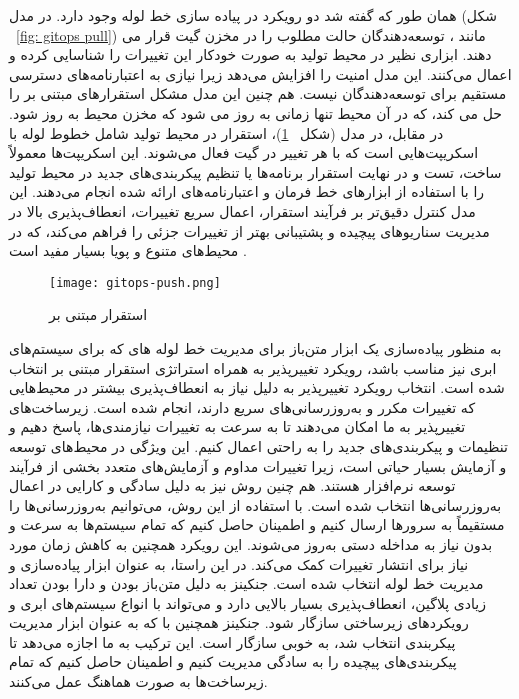همان طور که گفته شد دو رویکرد در پیاده سازی خط لوله  وجود دارد. در مدل  
(شکل 
~\ref{fig: gitops pull})
مانند ، توسعه‌دهندگان حالت مطلوب را در مخزن گیت قرار می دهند. ابزاری نظیر  در محیط تولید به صورت خودکار این تغییرات را شناسایی کرده و اعمال می‌کنند. این مدل امنیت را افزایش می‌دهد زیرا نیازی به اعتبارنامه‌های دسترسی مستقیم برای توسعه‌دهندگان نیست. هم چنین این مدل مشکل استقرارهای مبتنی بر  را حل می کند، که در آن محیط تنها زمانی به روز می شود که مخزن محیط به روز شود. 
در مقابل، در مدل  (شکل 
~\ref{fig: gitops push})، استقرار در محیط تولید شامل خطوط لوله  با اسکریپت‌هایی است که با هر تغییر در گیت فعال می‌شوند. این اسکریپت‌ها معمولاً ساخت، تست و در نهایت استقرار برنامه‌ها یا تنظیم پیکربندی‌های جدید در محیط تولید را با استفاده از ابزارهای خط فرمان و اعتبارنامه‌های ارائه شده انجام می‌دهند. این مدل کنترل دقیق‌تر بر فرآیند استقرار، اعمال سریع تغییرات، انعطاف‌پذیری بالا در مدیریت سناریوهای پیچیده و پشتیبانی بهتر از تغییرات جزئی را فراهم می‌کند، که در محیط‌های متنوع و پویا بسیار مفید است \cite{Devopsgitops}.
\begin{figure}[t]
	\centering
	\texttt{[image: gitops-push.png]}
	\caption{استقرار مبتنی بر }
	\label{fig: gitops push}
\end{figure}

به منظور پیاده‌سازی یک ابزار متن‌باز برای مدیریت خط لوله های  که برای سیستم‌های ابری نیز مناسب باشد،  رویکرد تغییرپذیر  به همراه استراتژی استقرار مبتنی بر  انتخاب شده است. انتخاب رویکرد تغییرپذیر به دلیل نیاز به انعطاف‌پذیری بیشتر در محیط‌هایی که تغییرات مکرر و به‌روزرسانی‌های سریع دارند، انجام شده است. زیرساخت‌های تغییرپذیر به ما امکان می‌دهند تا به سرعت به تغییرات نیازمندی‌ها، پاسخ دهیم و تنظیمات و پیکربندی‌های جدید را به راحتی اعمال کنیم. این ویژگی در محیط‌های توسعه و آزمایش بسیار حیاتی است، زیرا تغییرات مداوم و آزمایش‌های متعدد بخشی از فرآیند توسعه نرم‌افزار هستند. هم چنین روش  نیز به دلیل سادگی و کارایی در اعمال به‌روزرسانی‌ها انتخاب شده است. با استفاده از این روش، می‌توانیم به‌روزرسانی‌ها را مستقیماً به سرورها ارسال کنیم و اطمینان حاصل کنیم که تمام سیستم‌ها به سرعت و بدون نیاز به مداخله دستی به‌روز می‌شوند. این رویکرد همچنین به کاهش زمان مورد نیاز برای انتشار تغییرات کمک می‌کند. در این راستا،  به عنوان ابزار پیاده‌سازی و مدیریت خط لوله  انتخاب شده است. جنکینز به دلیل متن‌باز بودن و دارا بودن تعداد زیادی پلاگین، انعطاف‌پذیری بسیار بالایی دارد و می‌تواند با انواع سیستم‌های ابری و رویکردهای زیرساختی سازگار شود. جنکینز همچنین با  که به عنوان ابزار مدیریت پیکربندی انتخاب شد، به خوبی سازگار است. این ترکیب به ما اجازه می‌دهد تا پیکربندی‌های پیچیده را به سادگی مدیریت کنیم و اطمینان حاصل کنیم که تمام زیرساخت‌ها به صورت هماهنگ عمل می‌کنند.

